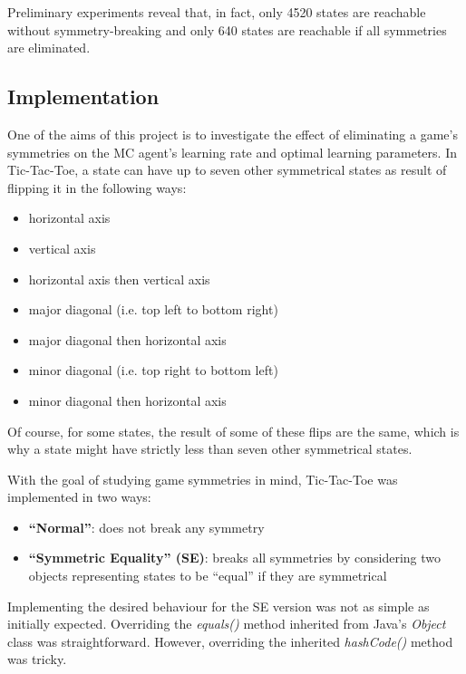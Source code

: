 \documentclass[11pt,a4paper]{report}
\begin{document}
Preliminary experiments reveal that, in fact, only 4520 states are reachable without symmetry-breaking and only 640 states are reachable if all symmetries are eliminated.


\subsection{Implementation}
\label{sec:TicTacToeImplementation}

One of the aims of this project is to investigate the effect of eliminating a game's symmetries on the MC agent's learning rate and optimal learning parameters. In Tic-Tac-Toe, a state can have up to seven other symmetrical states as result of flipping it in the following ways:

\begin{itemize}
	\item horizontal axis
	\item vertical axis
	\item horizontal axis then vertical axis
	\item major diagonal (i.e. top left to bottom right)
	\item major diagonal then horizontal axis
	\item minor diagonal (i.e. top right to bottom left)
	\item minor diagonal then horizontal axis
\end{itemize}

Of course, for some states, the result of some of these flips are the same, which is why a state might have strictly less than seven other symmetrical states.

With the goal of studying game symmetries in mind, Tic-Tac-Toe was implemented in two ways:

\begin{itemize}

	\item \textbf{``Normal''}:
does not break any symmetry

	\item \textbf{``Symmetric Equality'' (SE)}: 
breaks all symmetries by considering two objects representing states to be ``equal'' if they are symmetrical

\end{itemize}

Implementing the desired behaviour for the SE version was not as simple as initially expected. Overriding the \emph{equals()} method inherited from Java's \emph{Object} class was straightforward. However, overriding the inherited \emph{hashCode()} method was tricky.
\end{document}
